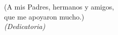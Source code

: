 \vspace*{0.7\textheight}
\hfill
{}
\begin{minipage}{0.4\textwidth}
    (A mis Padres, hermanos y amigos,\\
    que me apoyaron mucho.)\\
    \textit{(Dedicatoria)}
\end{minipage}
\newpage